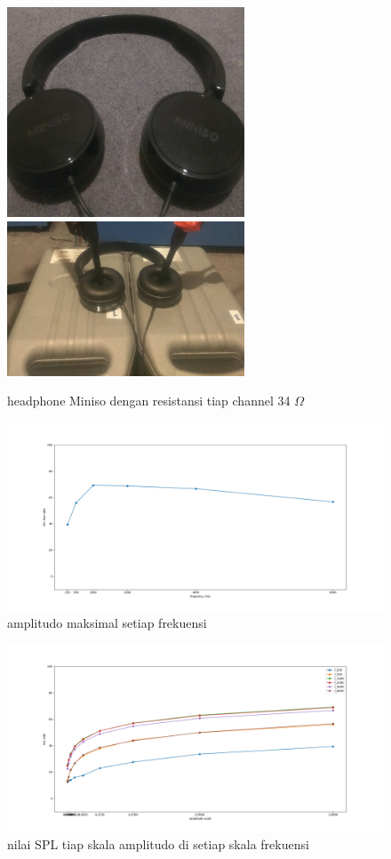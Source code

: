 \documentclass[12pt,]{article}
\begin{document}
  	\begin{figure}[!ht]
  		\centering
  		\includegraphics[width=200pt]{hasil/miniso/miniso}
  		\includegraphics[width=200pt]{hasil/miniso/miniso_setup}
  		\caption{headphone Miniso dengan resistansi tiap channel 34 $\Omega$}
  	\end{figure}
	
	\newpage
	\begin{figure}[!ht]
		\centering
		\includegraphics[width=500pt]{hasil/miniso/maxallfreq/max_freq}
		\caption{amplitudo maksimal setiap frekuensi}
	\end{figure}

	\begin{figure}[!ht]
		\centering
		\includegraphics[width=500pt]{hasil/miniso/maxallfreq/each_freq}
		\caption{nilai SPL tiap skala amplitudo di setiap skala frekuensi}
	\end{figure}
\end{document}
